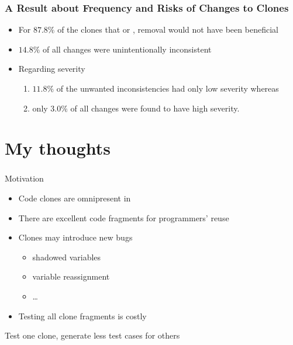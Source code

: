\documentclass[pdf]{beamer}
\begin{document}
\begin{frame}
\frametitle{A Result about Frequency and Risks of Changes to Clones}
\begin{itemize}
  \item For $87.8\%$ of the clones that  or
  , removal would not have been beneficial
  \item $14.8\%$ of all changes were unintentionally inconsistent
  \item Regarding severity
  \begin{enumerate}
    \item $11.8\%$ of the unwanted inconsistencies had
    only low severity whereas
    \item only $3.0\%$ of all changes were found to have high
    severity.
  \end{enumerate}
\end{itemize}
\end{frame}

\section{My thoughts}
\begin{frame}
\frametitle{\secname}
\begin{block}{Motivation}
\begin{itemize}
  \item Code clones are omnipresent in 
  \item There are excellent code fragments for programmers' reuse
  \item Clones may introduce new bugs
  \begin{itemize}
    \item shadowed variables
    \item variable reassignment
    \item \ldots
  \end{itemize}
  \item Testing all clone fragments is costly
\end{itemize}
\end{block}
\pause
\vskip11pt
\centerline{\alert{Test one clone, generate less test cases for others}}
\end{frame}
\end{document}
